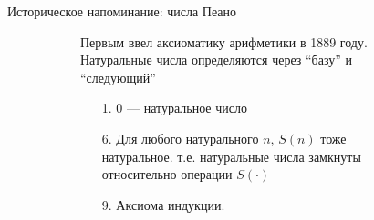 \begin{frame}{Историческое напоминание: числа Пеано}
\begin{figure}[ht]
  \begin{subfigure}[t]{.55\textwidth}
  \vspace{-8em}
  Первым ввел аксиоматику арифметики в 1889 году. Натуральные числа определяются через ``базу'' и ``следующий''\\

  \begin{enumerate}
  \item[1.] 0 --- натуральное число
  \item[6.] Для любого натурального $n$, $S(n)$ тоже натуральное. т.е. натуральные числа замкнуты относительно операции $S(\cdot)$
  \item [9.] Аксиома индукции.
  \end{enumerate}


\end{subfigure}
\end{figure}
\end{frame}
